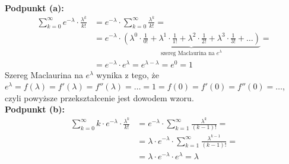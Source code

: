 \documentclass[a4paper,12pt]{article}
\begin{document}
\noindent \textbf{Podpunkt (a):}
\begin{align*}
    \sum\limits_{k=0}^{\infty} e^{-\lambda} \cdot \frac{\lambda^k}{k!} &= 
    e^{-\lambda} \cdot \sum\limits_{k=0}^{\infty} \frac{\lambda^k}{k!} = \\ 
    &= e^{-\lambda} \cdot \underbrace{\left( \lambda^0 \cdot \frac{1}{0!} 
    + \lambda^1 \cdot \frac{1}{1!} + \lambda^2 \cdot \frac{1}{2!} 
    + \lambda^3 \cdot \frac{1}{3!} + \ldots \right)}_{\text{szereg Maclaurina na }
    e^\lambda} = \\
    &= e^{-\lambda} \cdot e^\lambda = e^{\lambda - \lambda} = e^0 = 1
\end{align*}
\noindent Szereg Maclaurina na $e^\lambda$ wynika z tego, że $e^\lambda = f(\lambda)
= f'(\lambda) = f''(\lambda) = \ldots = 1 = f(0) = f'(0) = f''(0) = \ldots$, czyli 
powyższe przekształcenie jest dowodem wzoru.\\

\noindent \textbf{Podpunkt (b):}
\begin{align*}
    \sum\limits_{k=0}^{\infty} k \cdot e^{-\lambda} \cdot \frac{\lambda^k}{k!} &=
    e^{-\lambda} \cdot \sum\limits_{k=1}^{\infty} \frac{\lambda^k}{(k-1)!} = \\
    &= \lambda \cdot e^{-\lambda} \cdot \sum\limits_{k=1}^{\infty} 
    \frac{\lambda^{k-1}}{(k-1)!} = \\
    &= \lambda \cdot e^{-\lambda} \cdot e^{\lambda} = \lambda
\end{align*}
\end{document}
